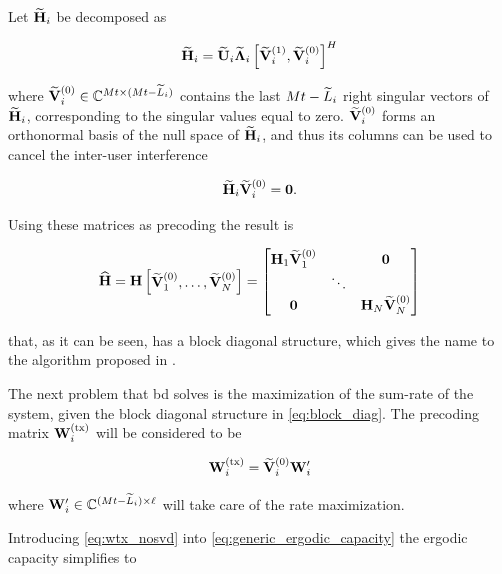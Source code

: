 Let $\mathbf{\widetilde{H}}_i$ be decomposed as

\begin{equation} \label{eq:htilde_svd}
    \mathbf{\widetilde{H}}_i = \mathbf{\widetilde{U}}_i \mathbf{\widetilde{\Lambda}}_i \left[ \mathbf{\widetilde{V}}_i^{(1)}, \mathbf{\widetilde{V}}_i^{(0)}
    \right]^H
\end{equation}

\noindent
where $\mathbf{\widetilde{V}}_i^{(0)} \in \mathbb{C}^{Mt \times (Mt - \widetilde{L}_i)}$ contains the last
$Mt - \widetilde{L}_i$ right singular vectors of $\mathbf{\widetilde{H}}_i$, corresponding to the
singular values equal to zero. $\mathbf{\widetilde{V}}_i^{(0)}$ forms an orthonormal basis of
the null space of $\mathbf{\widetilde{H}}_i$, and thus its columns can be used to cancel the
inter-user interference

\begin{equation} \label{eq:v0_zero_interf}
    \mathbf{\widetilde{H}}_i \mathbf{\widetilde{V}}_i^{(0)} = \mathbf{0}.
\end{equation}

Using these matrices as precoding the result is

\begin{equation} \label{eq:block_diag}
    \mathbf{\widehat{H}} = \mathbf{H} \begin{bmatrix}
        \mathbf{\widetilde{V}}_1^{(0)}, \ldots, \mathbf{\widetilde{V}}_N^{(0)}
    \end{bmatrix} = \begin{bmatrix}
        \mathbf{H}_1 \mathbf{\widetilde{V}}_1^{(0)} &        & \mathbf{0} \\
                              & \ddots & \\
        \mathbf{0}                 &        & \mathbf{H}_N \mathbf{\widetilde{V}}_N^{(0)}
    \end{bmatrix}
\end{equation}

\noindent
that, as it can be seen, has a block diagonal structure, which gives the name to
the algorithm proposed in \cite{spencer04}.

The next problem that \gls{bd} solves is the maximization of the sum-rate of the
system, given the block diagonal structure in \eqref{eq:block_diag}. The
precoding matrix $\mathbf{W}^{(\text{tx})}_i$ will be considered to be

\begin{equation} \label{eq:wtx_nosvd}
    \mathbf{W}^{(\text{tx})}_i = \mathbf{\widetilde{V}}_i^{(0)} \mathbf{W}_i^{\prime}
\end{equation}

\noindent
where $\mathbf{W}_i^{\prime} \in \mathbb{C}^{(Mt - \widetilde{L}_i) \times \ell}$ will take care of
the rate maximization.

Introducing \eqref{eq:wtx_nosvd} into \eqref{eq:generic_ergodic_capacity} the
ergodic capacity simplifies to

